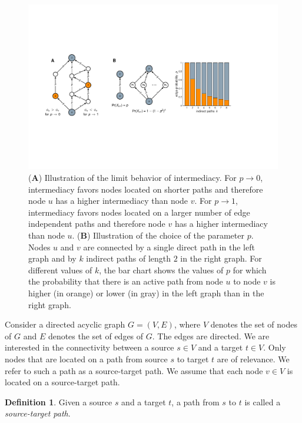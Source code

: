 \documentclass[9pt,twocolumn,twoside]{pnas-alt} %
\theoremstyle{definition}
\newtheorem{definition}{Definition}
\begin{document}
\begin{sansmath}\begin{figure}
    \centering%
    \includegraphics[width=11.4cm]{examples}
    \caption{(\textbf{A}) Illustration of the limit behavior of intermediacy. For $p \to 0$, intermediacy favors nodes located on shorter paths and therefore node $u$ has a higher intermediacy than node $v$. For $p \to 1$, intermediacy favors nodes located on a larger number of edge independent paths and therefore node $v$ has a higher intermediacy than node $u$. (\textbf{B}) Illustration of the choice of the parameter $p$. Nodes $u$ and $v$ are connected by a single direct path in the left graph and by $k$ indirect paths of length $2$ in the right graph. For different values of $k$, the bar chart shows the values of $p$ for which the probability that there is an active path from node $u$ to node $v$ is higher (in orange) or lower (in gray) in the left graph than in the right graph.}
    \label{fig:examples}
\end{figure}\end{sansmath}

Consider a directed acyclic graph $G = (V, E)$, where $V$ denotes the set of nodes of $G$ and $E$ denotes the set of edges of $G$. The edges are directed. We are interested in the connectivity between a source $s \in V$ and a target $t \in V$. Only nodes that are located on a path from source $s$ to target $t$ are of relevance. We refer to such a path as a source-target path. We assume that each node $v \in V$ is located on a source-target path.

\begin{definition}
    Given a source $s$ and a target $t$, a path from $s$ to $t$ is called a \emph{source-target path}.
\end{definition}
\end{document}
